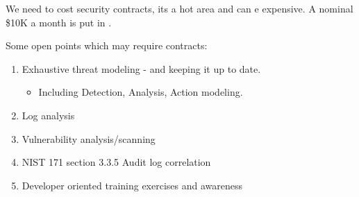 We need to cost security contracts, its a hot area and can e expensive. A nominal \$10K a month is put in .





Some open points which may require contracts:
\begin{enumerate}
\item Exhaustive threat modeling - and keeping it up to date.
\begin{itemize}
\item Including Detection, Analysis, Action modeling.
\end{itemize}
\item Log analysis
\item Vulnerability analysis/scanning
\item NIST 171 section  3.3.5 Audit log correlation
\item Developer oriented training exercises and awareness
\end{enumerate}
